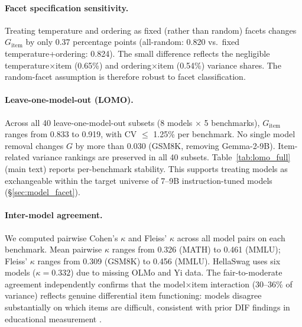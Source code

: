 \paragraph{Facet specification sensitivity.} Treating temperature and ordering as fixed (rather than random) facets changes $G_\text{item}$ by only 0.37 percentage points (all-random: 0.820 vs.\ fixed temperature+ordering: 0.824). The small difference reflects the negligible temperature$\times$item (0.65\%) and ordering$\times$item (0.54\%) variance shares. The random-facet assumption is therefore robust to facet classification.

\paragraph{Leave-one-model-out (LOMO).} Across all 40 leave-one-model-out subsets (8 models $\times$ 5 benchmarks), $G_\text{item}$ ranges from 0.833 to 0.919, with CV $\leq$ 1.25\% per benchmark. No single model removal changes $G$ by more than 0.030 (GSM8K, removing Gemma-2-9B). Item-related variance rankings are preserved in all 40 subsets. Table~\ref{tab:lomo_full} (main text) reports per-benchmark stability. This supports treating models as exchangeable within the target universe of 7--9B instruction-tuned models (\S\ref{sec:model_facet}).

\paragraph{Inter-model agreement.} We computed pairwise Cohen's $\kappa$ and Fleiss' $\kappa$ across all model pairs on each benchmark. Mean pairwise $\kappa$ ranges from 0.326 (MATH) to 0.461 (MMLU); Fleiss' $\kappa$ ranges from 0.309 (GSM8K) to 0.456 (MMLU). HellaSwag uses six models ($\kappa = 0.332$) due to missing OLMo and Yi data. The fair-to-moderate agreement independently confirms that the model$\times$item interaction (30--36\% of variance) reflects genuine differential item functioning: models disagree substantially on which items are difficult, consistent with prior DIF findings in educational measurement \cite{holland1993dif, clauser1998dif}.

